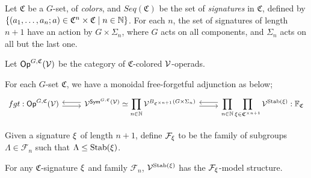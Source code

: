 \documentclass[psamsfonts,oneside,10pt,letterpaper
,draft
]{amsart}%
\renewcommand{\C}{\ensuremath{\mathfrak{C}}}
\renewcommand{\F}{\mathcal F}
\newcommand{\FF}{\ensuremath{\mathbb{F}}}
\renewcommand{\1}{\ensuremath{\mathbb{id}}}
\newcommand{\N}{\mathbb N}
\begin{document}
Let $\C$ be a $G$-set, of {\em colors}, and $Seq(\C)$ be the set of {\em signatures} in $\C$, defined by
$\sets{
  (a_1,\ldots, a_n; a)\in \C^n\times\C
}
{n\in\mathbb{N}}$.
For each $n$, the set of signatures of length $n+1$ have an action by $G\times \Sigma_n$, where $G$ acts on all components, and $\Sigma_n$ acts on all but the last one. 


\begin{definition}
      Let $\mathsf{Op}^{G,\mathfrak C}(\mathcal V)$ be the category of $\C$-colored $\mathcal V$-operads.
\end{definition}

For each $G$-set $\C$, we have a monoidal free-forgetful adjunction as below;
\begin{equation}
      \begin{tikzcd}
            fgt: \Op^{G,\mathfrak C}(\V) \arrow[r, shift right]
            &
            \V^{\Sym^{G,\mathfrak C}(\V)} \simeq
            \displaystyle\prod_{n \in \N} \V^{B_{\mathfrak C^{\times n+1}}(G \times \Sigma_n)}
            \arrow[l, shift right]
            \arrow[r, shift right]
            &
            \displaystyle\prod_{n\in\N}\displaystyle\prod_{\ksi\in \C^{\times n+1}}\V^{\Stab(\ksi)}
            \arrow[l, shift right]
            : \FF_\C
      \end{tikzcd}
\end{equation}

Given a signature $\xi$ of length $n+1$, define $\F_\ksi$ to be the family of subgroups $\Lambda\in \F_n$ such that $\Lambda\leq \mathrm{Stab}(\xi)$.
\begin{corollary}
      For any $\mathfrak C$-signature $\xi$ and family $\F_n$, $\mathcal V^{\mathrm{Stab}(\xi)}$ has the $\F_\ksi$-model structure.
\end{corollary}
\end{document}
